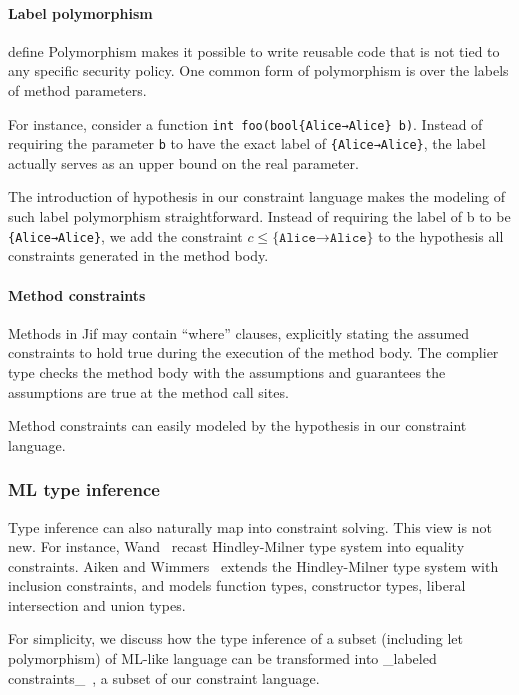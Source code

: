 \paragraph{Label polymorphism}
define
Polymorphism makes it possible to write reusable code that is not tied to any
specific security policy. One common form of polymorphism is over the labels of
method parameters. 

For instance, consider a function \texttt{int foo(bool\{Alice→Alice\} b)}.
Instead of requiring the parameter \texttt{b} to have the exact label of
\texttt{\{Alice→Alice\}}, the label actually serves as an upper bound on the
real parameter.

The introduction of hypothesis in our constraint language makes the modeling of
such label polymorphism straightforward. Instead of requiring the label of b to
be \texttt{\{Alice→Alice\}}, we add the constraint $c\leq
\texttt{\{Alice→Alice\}}$ to the hypothesis all constraints generated in the
method body.

\paragraph{Method constraints}

Methods in Jif may contain ``where'' clauses, explicitly stating the assumed
constraints to hold true during the execution of the method body. The complier
type checks the method body with the assumptions and guarantees the assumptions
are true at the method call sites. 

Method constraints can easily modeled by the hypothesis in our constraint
language.
 
\subsubsection{ML type inference}

Type inference can also naturally map into constraint solving. This
view is not new. For instance, Wand~\cite{wand-typeinference} recast
Hindley-Milner type system into equality constraints. Aiken and
Wimmers~\cite{aiken-typeinclusion} extends the Hindley-Milner type
system with inclusion constraints, and models function types,
constructor types, liberal intersection and union types. 

For simplicity, we discuss how the type inference of a subset
(including let polymorphism) of ML-like language can be transformed
into _labeled constraints_~\cite{haack:slicing}, a subset of our
constraint language.

